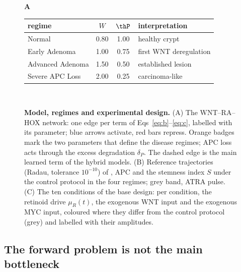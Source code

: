 \begin{figure}[tbp]
\centering
\begin{minipage}[c]{0.58\linewidth}
{\sffamily\bfseries\large A}\\[-0.5ex]
\centering
{}
\end{minipage}\hfill
\begin{minipage}[c]{0.39\linewidth}
\centering\footnotesize\setlength{\tabcolsep}{3pt}
\label{tab:regimes}
\begin{tabular}{lccl}
\toprule
regime & $W$ & $\thP$ & interpretation \\
\midrule
Normal & 0.80 & 1.00 & healthy crypt \\
Early Adenoma & 1.00 & 0.75 & first WNT deregulation \\
Advanced Adenoma & 1.50 & 0.50 & established lesion \\
Severe APC Loss & 2.00 & 0.25 & carcinoma-like \\
\bottomrule
\end{tabular}
\end{minipage}\\[1.5ex]
\caption{\textbf{Model, regimes and experimental design.} (A) The WNT--RA--HOX
network: one edge per term of Eqs~\eqref{eq:b}--\eqref{eq:c}, labelled with its
parameter; blue arrows activate, red bars repress. Orange badges mark the two
parameters that define the disease regimes; APC loss acts through the excess
degradation $\delta_P$. The dashed edge is the main learned term of the hybrid
models. (B) Reference trajectories (Radau, tolerance $10^{-10}$) of \bcat{}, APC
and the stemness index $S$ under the control protocol in the four regimes; grey
band, ATRA pulse. (C) The ten conditions of the base design: per condition, the
retinoid drive $\mu_R(t)$, the exogenous WNT input and the exogenous MYC input,
coloured where they differ from the control protocol (grey) and labelled with
their amplitudes.}
\label{fig:design}
\end{figure}

\subsection{The forward problem is not the main bottleneck}
\label{sec:res-forward}

